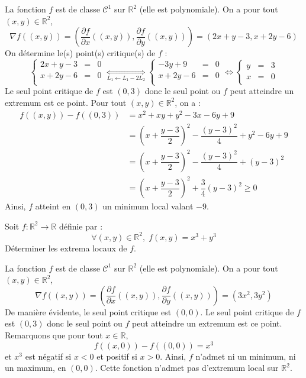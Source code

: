 \documentclass[a4paper,10pt]{report}
\begin{document}
\corr La fonction $f$ est de classe $\mathcal{C}^1$ sur $\mathbb{R}^2$ (elle est polynomiale). On a pour tout $(x,y) \in \mathbb{R}^2$,
$$ \nabla f ((x,y)) = \left( \dfrac{\partial f}{\partial x} ((x,y)),  \dfrac{\partial f}{\partial y} ((x,y)) \right) = (2x+y-3,x+2y-6)$$
On détermine le(s) point(s) critique(s) de $f$ :
$$ \left\lbrace \begin{array}{ccl}
2x+y-3 & = &0 \\
x+2y-6 & =& 0 \\
\end{array}\right. \underset{L_1 \leftarrow L_1-2L_2}{\Longleftrightarrow}\left\lbrace \begin{array}{ccl}
-3y+9 & =& 0 \\
x+2y-6 & =& 0 \\
\end{array}\right. \Longleftrightarrow \left\lbrace \begin{array}{ccl}
y & = & 3 \\
x & =  & 0 \\
\end{array}\right.$$
Le seul point critique de $f$ est $(0,3)$ donc le seul point ou $f$ peut atteindre un extremum est ce point. Pour tout $(x,y) \in \mathbb{R}^2$, on a :
\begin{align*}
 f((x,y)) - f((0,3)) & = x^{2} + xy + y^{2} - 3x - 6y + 9 \\
 & = \left( x + \dfrac{y-3}{2} \right)^2 - \dfrac{(y-3)^2}{4} + y^2-6y+9 \\
 & = \left( x + \dfrac{y-3}{2} \right)^2 - \dfrac{(y-3)^2}{4} + (y-3)^2 \\
 & = \left( x + \dfrac{y-3}{2} \right)^2 + \dfrac{3}{4} (y-3)^2 \geq 0
 \end{align*}
 Ainsi, $f$ atteint en $(0,3)$ un minimum local valant $-9$.
 
 
 \begin{Exa} Soit $f : \mathbb{R}^2 \rightarrow \mathbb{R}$ définie par :
$$ \forall (x,y) \in \mathbb{R}^2, \; f(x,y) = x^3+y^3$$
Déterminer les extrema locaux de $f$.
\end{Exa}

\corr La fonction $f$ est de classe $\mathcal{C}^1$ sur $\mathbb{R}^2$ (elle est polynomiale). On a pour tout $(x,y) \in \mathbb{R}^2$,
$$ \nabla f ((x,y)) = \left( \dfrac{\partial f}{\partial x} ((x,y)),  \dfrac{\partial f}{\partial y} ((x,y)) \right) = (3x^2,3y^2)$$
De manière évidente, le seul point critique est $(0,0)$. Le seul point critique de $f$ est $(0,3)$ donc le seul point ou $f$ peut atteindre un extremum est ce point. Remarquons que pour tout $x \in \mathbb{R}$,
$$ f((x,0))-f((0,0)) = x^3$$
et $x^3$ est négatif si $x<0$ et positif si $x>0$. Ainsi, $f$ n'admet ni un minimum, ni un maximum, en $(0,0)$. Cette fonction n'admet pas d'extremum local sur $\mathbb{R}^2$.
 
\end{document}
